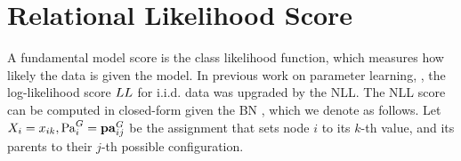 \documentclass{article}
\begin{document}
\begin{table}[tb]
\caption{The IMDb database frequency of a joint assignment to first-order random variables, compared to the BN probabilities computed using the network parameters of Figure~\ref{fig:bn}.}
\begin{center}
\end{center}
\label{table:frequency}
\end{table}%


\section{Relational Likelihood Score}
A fundamental model score is the class likelihood function, which measures how likely the data is given the model.
In previous work on parameter learning, \cite{Xiang2011,Schulte2011}, the log-likelihood score $LL$ for i.i.d. data was upgraded by the  NLL. The NLL score can be computed in closed-form given the BN , which we denote as follows. Let $X_{i} = x_{ik},\mathrm{Pa}_{i}^{G}=\mathbf{pa}_{ij}^{G}$ be the assignment that sets node $i$ to its $k$-th value, and its parents to their $j$-th possible configuration. 
\end{document}

